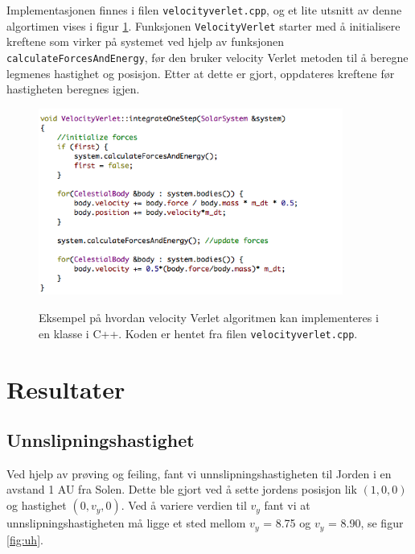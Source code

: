 \documentclass[11pt,a4paper]{article}
\begin{document}
Implementasjonen finnes i filen \texttt{velocityverlet.cpp}, og et lite utsnitt av denne algortimen vises i figur \ref{vv}. Funksjonen \texttt{VelocityVerlet} starter med å initialisere kreftene som virker på systemet ved hjelp av funksjonen \texttt{calculateForcesAndEnergy}, før den bruker velocity Verlet metoden til å beregne legmenes hastighet og posisjon. Etter at dette er gjort, oppdateres kreftene før hastigheten beregnes igjen.

\FloatBarrier
\begin{figure}[!ht]
\begin{center}
  \includegraphics[width = 100mm]{vv.png}\\
  \caption{Eksempel på hvordan velocity Verlet algoritmen kan implementeres i en klasse i C++. Koden er hentet fra filen \texttt{velocityverlet.cpp}.}   \label{vv}
  \end{center}
  \end{figure}
\FloatBarrier

\section{Resultater}
\subsection{Unnslipningshastighet}
Ved hjelp av prøving og feiling, fant vi unnslipningshastigheten til Jorden i en avstand 1 AU fra Solen. Dette ble gjort ved å sette jordens posisjon lik $(1,0,0)$ og hastighet $(0,v_y,0)$. Ved å variere verdien til $v_y$ fant vi at unnslipningshastigheten må ligge et sted mellom $v_y$ = 8.75 og $v_y$ = 8.90, se figur \ref{fig:uh}. 
\end{document}

